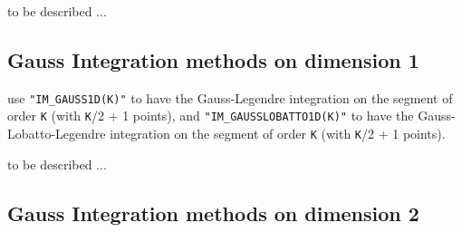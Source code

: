 \documentclass[11pt,a4paper]{article}
\begin{document}
to be described ...


\subsection{Gauss Integration methods on dimension 1}

use {\tt "IM\_GAUSS1D(K)"} to have the Gauss-Legendre integration on the segment of order {\tt K} (with {\tt K}/2 + 1 points), and {\tt "IM\_GAUSSLOBATTO1D(K)"} to have the Gauss-Lobatto-Legendre integration on the segment of order {\tt K} (with {\tt K}/2 + 1 points).


to be described ...

\subsection{Gauss Integration methods on dimension 2}
\end{document}
